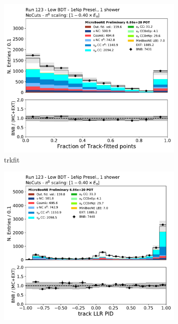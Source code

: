 \begin{figure}[H]
    \centering
    \begin{subfigure}{0.3\textwidth}
    \includegraphics[width=1.0\textwidth]{Sidebands/Figures/1eNp/LPID_NPOneShr_None_pi0e40/trkfit.pdf}
    \caption{trkfit}
    \end{subfigure}
    \begin{subfigure}{0.3\textwidth}
    \includegraphics[width=1.0\textwidth]{Sidebands/Figures/1eNp/LPID_NPOneShr_None_pi0e40/trkpid.pdf}

\end{subfigure}
\end{figure}
